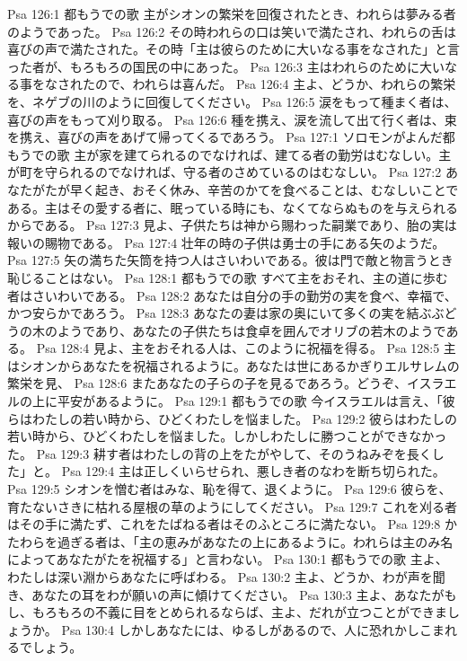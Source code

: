 Psa 126:1  都もうでの歌 主がシオンの繁栄を回復されたとき、われらは夢みる者のようであった。
Psa 126:2  その時われらの口は笑いで満たされ、われらの舌は喜びの声で満たされた。その時「主は彼らのために大いなる事をなされた」と言った者が、もろもろの国民の中にあった。
Psa 126:3  主はわれらのために大いなる事をなされたので、われらは喜んだ。
Psa 126:4  主よ、どうか、われらの繁栄を、ネゲブの川のように回復してください。
Psa 126:5  涙をもって種まく者は、喜びの声をもって刈り取る。
Psa 126:6  種を携え、涙を流して出て行く者は、束を携え、喜びの声をあげて帰ってくるであろう。
Psa 127:1  ソロモンがよんだ都もうでの歌 主が家を建てられるのでなければ、建てる者の勤労はむなしい。主が町を守られるのでなければ、守る者のさめているのはむなしい。
Psa 127:2  あなたがたが早く起き、おそく休み、辛苦のかてを食べることは、むなしいことである。主はその愛する者に、眠っている時にも、なくてならぬものを与えられるからである。
Psa 127:3  見よ、子供たちは神から賜わった嗣業であり、胎の実は報いの賜物である。
Psa 127:4  壮年の時の子供は勇士の手にある矢のようだ。
Psa 127:5  矢の満ちた矢筒を持つ人はさいわいである。彼は門で敵と物言うとき恥じることはない。
Psa 128:1  都もうでの歌 すべて主をおそれ、主の道に歩む者はさいわいである。
Psa 128:2  あなたは自分の手の勤労の実を食べ、幸福で、かつ安らかであろう。
Psa 128:3  あなたの妻は家の奥にいて多くの実を結ぶぶどうの木のようであり、あなたの子供たちは食卓を囲んでオリブの若木のようである。
Psa 128:4  見よ、主をおそれる人は、このように祝福を得る。
Psa 128:5  主はシオンからあなたを祝福されるように。あなたは世にあるかぎりエルサレムの繁栄を見、
Psa 128:6  またあなたの子らの子を見るであろう。どうぞ、イスラエルの上に平安があるように。
Psa 129:1  都もうでの歌 今イスラエルは言え、「彼らはわたしの若い時から、ひどくわたしを悩ました。
Psa 129:2  彼らはわたしの若い時から、ひどくわたしを悩ました。しかしわたしに勝つことができなかった。
Psa 129:3  耕す者はわたしの背の上をたがやして、そのうねみぞを長くした」と。
Psa 129:4  主は正しくいらせられ、悪しき者のなわを断ち切られた。
Psa 129:5  シオンを憎む者はみな、恥を得て、退くように。
Psa 129:6  彼らを、育たないさきに枯れる屋根の草のようにしてください。
Psa 129:7  これを刈る者はその手に満たず、これをたばねる者はそのふところに満たない。
Psa 129:8  かたわらを過ぎる者は、「主の恵みがあなたの上にあるように。われらは主のみ名によってあなたがたを祝福する」と言わない。
Psa 130:1  都もうでの歌 主よ、わたしは深い淵からあなたに呼ばわる。
Psa 130:2  主よ、どうか、わが声を聞き、あなたの耳をわが願いの声に傾けてください。
Psa 130:3  主よ、あなたがもし、もろもろの不義に目をとめられるならば、主よ、だれが立つことができましょうか。
Psa 130:4  しかしあなたには、ゆるしがあるので、人に恐れかしこまれるでしょう。
